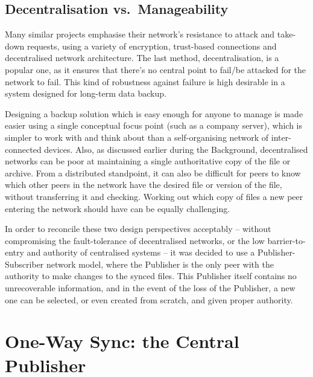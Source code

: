 \documentclass[12pt,a4paper,]{adreport}
\begin{document}
\subsection{Decentralisation
vs.~Manageability}\label{decentralisation-vs.manageability}

Many similar projects emphasise their network's resistance to attack and
take-down requests, using a variety of encryption, trust-based
connections and decentralised network architecture. The last method,
decentralisation, is a popular one, as it ensures that there's no
central point to fail/be attacked for the network to fail. This kind of
robustness against failure is high desirable in a system designed for
long-term data backup.

Designing a backup solution which is easy enough for anyone to manage is
made easier using a single conceptual focus point (such as a company
server), which is simpler to work with and think about than a
self-organising network of inter-connected devices. Also, as discussed
earlier during the Background, decentralised networks can be poor at
maintaining a single authoritative copy of the file or archive. From a
distributed standpoint, it can also be difficult for peers to know which
other peers in the network have the desired file or version of the file,
without transferring it and checking. Working out which copy of files a
new peer entering the network should have can be equally challenging.

In order to reconcile these two design perspectives acceptably --
without compromising the fault-tolerance of decentralised networks, or
the low barrier-to-entry and authority of centralised systems -- it was
decided to use a Publisher-Subscriber network model, where the Publisher
is the only peer with the authority to make changes to the synced files.
This Publisher itself contains no unrecoverable information, and in the
event of the loss of the Publisher, a new one can be selected, or even
created from scratch, and given proper authority.

\section{One-Way Sync: the Central
Publisher}\label{one-way-sync-the-central-publisher}
\end{document}
